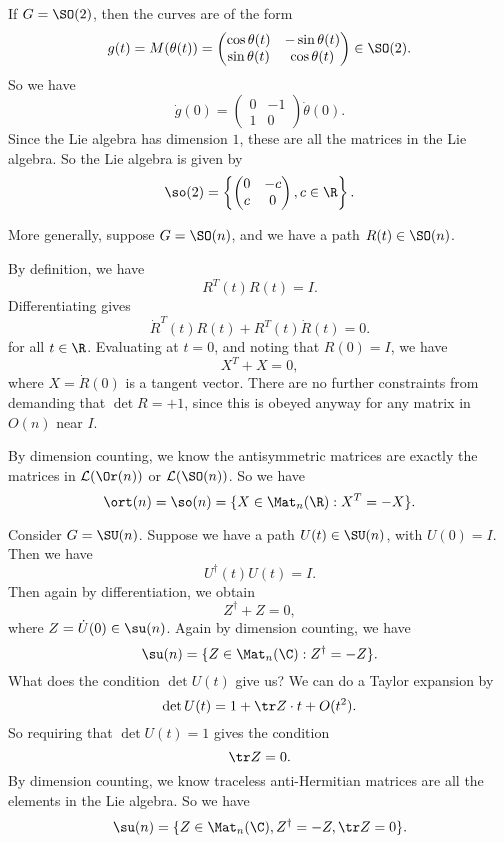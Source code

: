 \documentclass[a4paper]{article}
\begin{document}
\begin{eg}
  If $G = \SO(2)$, then the curves are of the form
  \[
    g(t) = M(\theta(t)) =
    \begin{pmatrix}
      \cos \theta(t) & -\sin \theta (t)\\
      \sin \theta(t) & \cos \theta(t)
    \end{pmatrix} \in \SO(2).
  \]
  So we have
  \[
    \dot{g}(0) =
    \begin{pmatrix}
      0 & -1\\
      1 & 0
    \end{pmatrix} \dot{\theta}(0).
  \]
  Since the Lie algebra has dimension $1$, these are all the matrices in the Lie algebra. So the Lie algebra is given by
  \[
    \so(2) = \left\{
      \begin{pmatrix}
        0 & -c\\
        c & 0
      \end{pmatrix}, c \in \R
    \right\}.
  \]
\end{eg}

\begin{eg}
  More generally, suppose $G = \SO(n)$, and we have a path $R(t) \in \SO(n)$.

  By definition, we have
  \[
    R^T(t) R(t) = I.
  \]
  Differentiating gives
  \[
    \dot{R}^T(t) R(t) + R^T(t) \dot{R}(t) = 0.
  \]
  for all $t \in \R$. Evaluating at $t = 0$, and noting that $R(0) = I$, we have
  \[
    X^T + X = 0,
  \]
  where $X = \dot{R}(0)$ is a tangent vector. There are no further constraints from demanding that $\det R = +1$, since this is obeyed anyway for any matrix in $O(n)$ near $I$.

  By dimension counting, we know the antisymmetric matrices are exactly the matrices in $\mathcal{L}(\Or(n))$ or $\mathcal{L}(\SO(n))$. So we have
  \[
    \ort(n) = \so(n) = \{X \in \Mat_n(\R): X^T = -X\}.
  \]
\end{eg}

\begin{eg}
  Consider $G = \SU(n)$. Suppose we have a path $U(t) \in \SU(n)$, with $U(0) = I$. Then we have
  \[
    U^\dagger (t) U(t) = I.
  \]
  Then again by differentiation, we obtain
  \[
    Z^\dagger + Z = 0,
  \]
  where $Z = \dot{U}(0) \in \su(n)$. Again by dimension counting, we have
  \[
    \su(n) = \{Z \in \Mat_n(\C): Z^\dagger = -Z\}.
  \]
  What does the condition $\det U(t)$ give us? We can do a Taylor expansion by
  \[
    \det U(t) = 1 + \tr Z \cdot t + O(t^2).
  \]
  So requiring that $\det U(t) = 1$ gives the condition
  \[
    \tr Z = 0.
  \]
  By dimension counting, we know traceless anti-Hermitian matrices are all the elements in the Lie algebra. So we have
  \[
    \su(n) = \{Z \in \Mat_n(\C), Z^\dagger = -Z, \tr Z = 0\}.
  \]
\end{eg}
\end{document}
